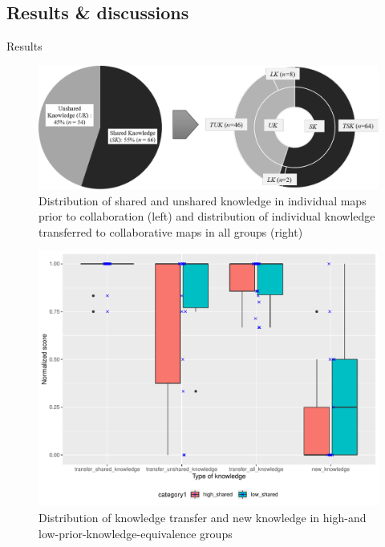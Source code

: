 \subsection{Results \& discussions}
\begin{frame}[allowframebreaks]{Results}
    \begin{figure}[tb]
     \begin{center}
      \includegraphics[width=120mm]{images/rqb_dist-knowledge.pdf}
      \end{center}
      \caption{Distribution  of  shared  and  unshared  knowledge  in  individual maps prior to collaboration (left) and distribution of individual knowledge transferred to collaborative maps in all groups (right)}
      \label{rqb::result_dist}  
    \end{figure}
    
    \begin{figure}[tb]
     \begin{center}
      \includegraphics[width=120mm]{images/rqb_dist-shared-all-redraw.pdf}
      \end{center}
      \caption{Distribution of knowledge transfer and new knowledge in high-and  low-prior-knowledge-equivalence  groups}
      \label{rqb::dist_equival}  
    \end{figure}

\end{frame}
    

